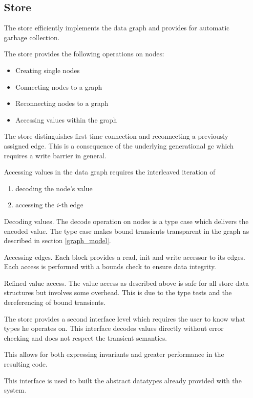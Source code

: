 \subsection{Store}
The store efficiently implements the data graph and provides for
automatic garbage collection.

The store provides the following operations on nodes:
\begin{itemize}
\item Creating single nodes
\item Connecting nodes to a graph
\item Reconnecting nodes to a graph
\item Accessing values within the graph
\end{itemize}
The store distinguishes first time connection
and reconnecting a previously assigned edge. This is a consequence
of the underlying generational gc which requires a write barrier in general.

Accessing values in the data graph requires the interleaved iteration of
\begin{enumerate}
\item decoding the node's value
\item accessing the $i$-th edge
\end{enumerate}
\begin{paragraph}{Decoding values.}
The decode operation on nodes is a type case which delivers
the encoded value. The type case makes bound transients transparent
in the graph as described in section \ref{graph_model}.
\end{paragraph}
\begin{paragraph}{Accessing edges.}
Each block provides a read, init and write accessor to its edges.
Each access is performed with a bounds check to ensure data integrity.
\end{paragraph}
\begin{paragraph}{Refined value access.}
The value access as described above is safe for all store data structures
but involves some overhead. This is due to the type tests and the
dereferencing of bound transients.

The store provides a second interface level which requires the user
to know what types he operates on. This interface decodes values directly
without error checking and does not respect the transient semantics.

This allows for both expressing invariants
and greater performance in the resulting code.

This interface is used to built the abstract datatypes already provided
with the system.
\end{paragraph}
